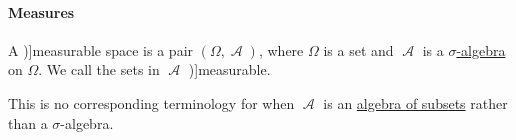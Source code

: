 \paragraph{Measures}

\begin{definition}\label{def:measurable_space}
  A \term[ru=измеримое пространство (\cite[def. 1.2.3]{Богачёв2003ТеорияМерыТом1})]{measurable space} is a pair \( (\Omega, \mscrA) \), where \( \Omega \) is a set and \( \mscrA \) is a \hyperref[def:sigma_algebra]{\( \sigma \)-algebra} on \( \Omega \). We call the sets in \( \mscrA \) \term[ru=измеримое (множество) (\cite[52]{КанторовичАкилов1984ФункАнализ})]{measurable}.
\end{definition}
\begin{comments}
  \item This is no corresponding terminology for when \( \mscrA \) is an \hyperref[def:algebra_of_subsets]{algebra of subsets} rather than a \( \sigma \)-algebra.
\end{comments}

